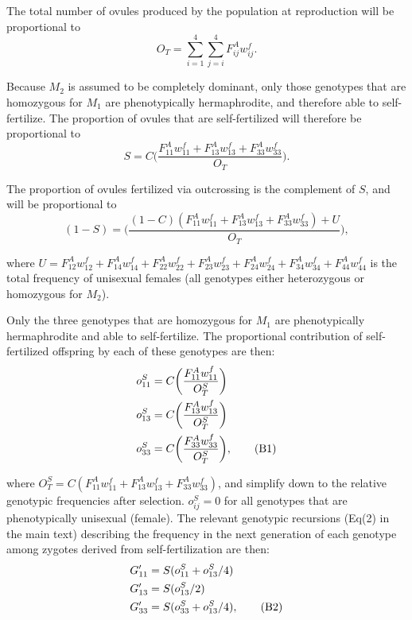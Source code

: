 \documentclass{article}
\newcommand\numberthis{\addtocounter{equation}{1}\tag{\theequation}}
\begin{document}
\noindent The total number of ovules produced by the population at reproduction will be proportional to
\begin{equation} 
O_T = \sum_{i=1}^{4}\sum_{j=i}^{4} F^A_{ij} w^f_{ij}.
\end{equation}

\noindent Because $M_2$ is assumed to be completely dominant, only those genotypes that are homozygous for $M_1$ are phenotypically hermaphrodite, and therefore able to self-fertilize. The proportion of ovules that are self-fertilized will therefore be proportional to
\begin{equation} 
S = C \bigg( \frac{F^A_{11} w^f_{11} + F^A_{13} w^f_{13} + F^A_{33} w^f_{33}}{O_T}\bigg).
\end{equation}

\noindent The proportion of ovules fertilized via outcrossing is the complement of $S$, and will be proportional to
\begin{equation} 
(1 - S) = \bigg( \frac{(1 - C)(F^A_{11} w^f_{11} + F^A_{13} w^f_{13} + F^A_{33} w^f_{33}) + U}{O_T}\bigg),
\end{equation}

\noindent where $U = F^A_{12} w^f_{12} + F^A_{14} w^f_{14} + F^A_{22} w^f_{22} + F^A_{23} w^f_{23} + F^A_{24} w^f_{24} + F^A_{34} w^f_{34} + F^A_{44} w^f_{44}$ is the total frequency of unisexual females (all genotypes either heterozygous or homozygous for $M_2$). 

Only the three genotypes that are homozygous for $M_1$ are phenotypically hermaphrodite and able to self-fertilize. The proportional contribution of self-fertilized offspring by each of these genotypes are then:
\begin{align*} \label{eq:DomSelfOvules}
    o^S_{11} &= C \bigg(\frac{F^A_{11} w^f_{11}}{O^S_T} \bigg) \\
    o^S_{13} &= C \bigg(\frac{F^A_{13} w^f_{13}}{O^S_T} \bigg) \\
    o^S_{33} &= C \bigg(\frac{F^A_{33} w^f_{33}}{O^S_T} \bigg), \numberthis
\end{align*}

\noindent where $O^S_T = C(F^A_{11} w^f_{11} + F^A_{13} w^f_{13} + F^A_{33} w^f_{33})$, and simplify down to the relative genotypic frequencies after selection. $o^S_{ij} = 0$ for all genotypes that are phenotypically unisexual (female). The relevant genotypic recursions (Eq(2) in the main text) describing the frequency in the next generation of each genotype among zygotes derived from self-fertilization are then:
\begin{align*} \label{eq:DomSelfRecs}
    G'_{11} &= S (o^S_{11} + o^S_{13}/4) \\
    G'_{13} &= S (o^S_{13}/2) \\
    G'_{33} &= S (o^S_{33} + o^S_{13}/4), \numberthis
\end{align*}
\end{document}
